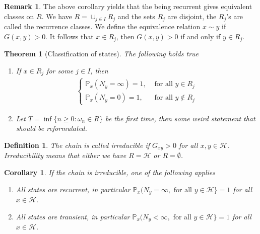 \documentclass[11pt,a4paper, final]{article}
\newtheorem{thm}{Theorem}[section]
\newtheorem{cor}{Corollary}[section]
\newtheorem{defn}{Definition}[section]
\theoremstyle{definition}
\newtheorem{rem}{Remark}[section]
\begin{document}
\begin{rem} The above corollary yields that the being recurrent gives equivalent classes on $R$. We have $R = \cup_{j \in I} R_j$ and the sets $R_j$ are disjoint, the $R_j$'s are called the recurrence classes. We define the equivalence relation $x \sim y$ if $G(x,y) >0$. It follows that $x \in R_j$, then $G(x,y) >0$ if and only if $y \in R_j$. 
\end{rem}
\begin{thm}[Classification of states] The following holds true
\begin{enumerate}
\item If $x \in R_j$ for some $j \in I$, then 
\begin{align*}
\begin{cases} \mathbb{P}_x ( N_y = \infty) = 1, & \text{ for all } y \in R_j \\ 
\mathbb{P}_x ( N_y = 0) = 1, & \text{ for all } y \notin R_j \end{cases}
\end{align*}
\item Let $T= \inf \lbrace n \geq 0 : \omega_n \in R \rbrace$ be the first time, then some weird statement that should be reformulated. 
\end{enumerate}
\end{thm}
\begin{defn} The chain is called irreducible if $G_{xy} > 0$ for all $x,y \in \mathcal{H}$. Irreducibility means that either we have $R= \mathcal{H}$ or $R= \emptyset$. 
\end{defn}
\begin{cor} If the chain is irreducible, one of the following applies
\begin{enumerate}
\item All states are recurrent, in particular $\mathbb{P}_x( N_y = \infty, \text{ for all } y \in \mathcal{H} \rbrace = 1$ for all $x \in \mathcal{H}$.
\item All states are transient, in particular $\mathbb{P}_x( N_y < \infty, \text{ for all } y \in \mathcal{H} \rbrace = 1$ for all $x \in \mathcal{H}$. 
\end{enumerate}
\end{cor}
\newpage
\end{document}
